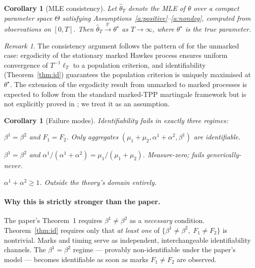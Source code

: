 \documentclass[11pt]{article}
\newtheorem{corollary}[theorem]{Corollary}
\theoremstyle{remark}
\newtheorem*{remark}{Remark}
\newcommand{\PP}{\mathbb{P}}
\begin{document}
\begin{corollary}[MLE consistency]\label{cor:consistency}
Let $\hat\theta_T$ denote the MLE of $\theta$ over a compact parameter space $\Theta$ satisfying Assumptions~\ref{a:positive}--\ref{a:nondeg}, computed from observations on $[0, T]$. Then $\hat\theta_T \xrightarrow{\;\PP\;} \theta^\star$ as $T \to \infty$, where $\theta^\star$ is the true parameter.
\end{corollary}
\begin{remark}
The consistency argument follows the pattern of \citet{gao2018consistency} for the unmarked case: ergodicity of the stationary marked Hawkes process ensures uniform convergence of $T^{-1}\ell_T$ to a population criterion, and identifiability (Theorem~\ref{thm:id}) guarantees the population criterion is uniquely maximised at $\theta^\star$. The extension of the ergodicity result from unmarked to marked processes is expected to follow from the standard marked-TPP martingale framework but is not explicitly proved in \citet{gao2018consistency}; we treat it as an assumption.
\end{remark}

\begin{corollary}[Failure modes]\label{cor:failure}
Identifiability fails in exactly three regimes:
\begin{description}[leftmargin=*,nosep]
\item[(F1) Joint collapse.] $\beta^1 = \beta^2$ \emph{and} $F_1 = F_2$. Only aggregates $(\mu_1 + \mu_2, \alpha^1 + \alpha^2, \beta^1)$ are identifiable.
\item[(F2) Degenerate weights.] $\beta^1 = \beta^2$ and $\alpha^1/(\alpha^1+\alpha^2) = \mu_1/(\mu_1+\mu_2)$. Measure-zero; fails generically-never.
\item[(F3) Non-ergodicity.] $\alpha^1 + \alpha^2 \ge 1$. Outside the theory's domain entirely.
\end{description}
\end{corollary}

\paragraph{Why this is strictly stronger than the paper.}
The paper's Theorem~1 requires $\beta^1 \ne \beta^2$ as a \emph{necessary} condition. Theorem~\ref{thm:id} requires only that \emph{at least one} of $\{\beta^1 \ne \beta^2,\; F_1 \ne F_2\}$ is nontrivial. Marks and timing serve as independent, interchangeable identifiability channels. The $\beta^1 = \beta^2$ regime --- provably non-identifiable under the paper's model --- becomes identifiable as soon as marks $F_1 \ne F_2$ are observed.
\end{document}
